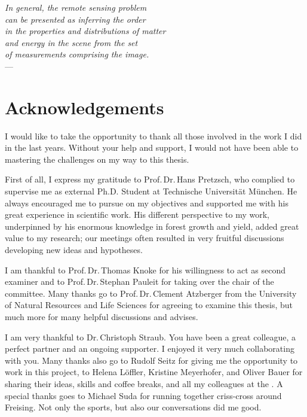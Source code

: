 
\begin{flushright}{\slshape    
		In general, the remote sensing problem \\
		can be presented as inferring the order \\ 
		in the properties and distributions of matter \\ 
		and energy in the scene from the set \\
		of measurements comprising the image.} \\ \medskip
		--- \cite{Strahler.1986}
		
	
\end{flushright}


\begingroup
\let\clearpage\relax
\let\cleardoublepage\relax
\let\cleardoublepage\relax

\chapter*{Acknowledgements}

I would like to take the opportunity to thank all those involved in the work I did in the last years.
Without your help and support, I would not have been able to mastering the challenges on my way to this thesis.

First of all, I express my gratitude to Prof.\,Dr.\,Hans Pretzsch, 
who complied to supervise me as external Ph.D. Student at Technische Universität München. 
He always encouraged me to pursue on my objectives and supported me with his great experience in scientific work.
His different perspective to my work, underpinned by his enormous knowledge in forest growth and yield, added great value to my research; 
our meetings often resulted in very fruitful discussions developing new ideas and hypotheses.

I am thankful to Prof.\,Dr.\,Thomas Knoke for his willingness to act as second examiner
and to Prof.\,Dr.\,Stephan Pauleit for taking over the chair of the committee.
Many thanks go to Prof.\,Dr.\,Clement Atzberger from the University of Natural Resources and Life Sciences 
for agreeing to examine this thesis, but much more for many helpful discussions and advises.  

I am very thankful to Dr.\,Christoph Straub. 
You have been a great colleague, a perfect partner and an ongoing supporter.
I enjoyed it very much collaborating with you. 
Many thanks also go to Rudolf Seitz for giving me the opportunity to work in this project, 
to Helena Löffler, Kristine Meyerhofer, and Oliver Bauer for sharing their ideas, skills and coffee breaks,
and all my colleagues at the \myInstitute. 
A special thanks goes to Michael Suda for running together criss-cross around Freising.
Not only the sports, but also our conversations did me good.   
 
